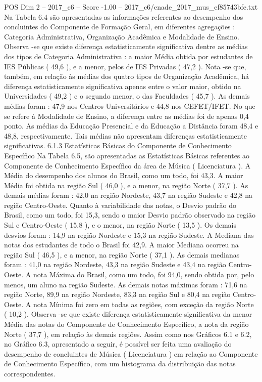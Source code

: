 \begin{textsample}{POS Dim 2 – 2017\_c6 – Score -1.00 – 2017\_c6/enade\_2017\_mus\_ef85743bfe.txt}
Na Tabela 6.4 são apresentadas as informações referentes ao desempenho dos concluintes do Componente de Formação Geral, em diferentes agregações : Categoria Administrativa, Organização Acadêmica e Modalidade de Ensino.
Observa -se que existe diferença estatisticamente significativa dentre as médias dos tipos de Categoria Administrativa : a maior Média obtida por estudantes de IES Públicas ( 49,6 ), e a menor, pelos de IES Privadas ( 47,2 ).
Nota -se que, também, em relação às médias dos quatro tipos de Organização Acadêmica, há diferença estatisticamente significativa apenas entre o valor maior, obtido na Universidades ( 49,2 ) e o segundo menor, o das Faculdades ( 45,7 ).
As demais médias foram : 47,9 nos Centros Universitários e 44,8 nos CEFET/IFET.
No que se refere à Modalidade de Ensino, a diferença entre as médias foi de apenas 0,4 ponto.
As médias da Educação Presencial e da Educação a Distância foram 48,4 e 48,8, respectivamente.
Tais médias não apresentam diferenças estatisticamente significativas. 6.1.3 Estatísticas Básicas do Componente de Conhecimento Específico Na Tabela 6.5, são apresentadas as Estatísticas Básicas referentes ao Componente de Conhecimento Específico da área de Música ( Licenciatura ).
A Média do desempenho dos alunos do Brasil, como um todo, foi 43,3.
A maior Média foi obtida na região Sul ( 46,0 ), e a menor, na região Norte ( 37,7 ).
As demais médias foram : 42,0 na região Nordeste, 43,7 na região Sudeste e 42,8 na região Centro-Oeste.
Quanto à variabilidade das notas, o Desvio padrão do Brasil, como um todo, foi 15,3, sendo o maior Desvio padrão observado na região Sul e Centro-Oeste ( 15,8 ), e o menor, na região Norte ( 13,5 ).
Os demais desvios foram : 14,9 na região Nordeste e 15,3 na região Sudeste.
A Mediana das notas dos estudantes de todo o Brasil foi 42,9.
A maior Mediana ocorreu na região Sul ( 46,5 ), e a menor, na região Norte ( 37,1 ).
As demais medianas foram : 41,0 na região Nordeste, 43,3 na região Sudeste e 43,4 na região Centro-Oeste.
A nota Máxima do Brasil, como um todo, foi 94,0, sendo obtida por, pelo menos, um aluno na região Sudeste.
As demais notas máximas foram : 71,6 na região Norte, 89,9 na região Nordeste, 83,3 na região Sul e 80,4 na região Centro-Oeste.
A nota Mínima foi zero em todas as regiões, com exceção da região Norte ( 10,2 ).
Observa -se que existe diferença estatisticamente significativa da menor Média das notas do Componente de Conhecimento Específico, a nota da região Norte ( 37,7 ), em relação às demais regiões.
Assim como nos Gráficos 6.1 e 6.2, no Gráfico 6.3, apresentado a seguir, é possível ser feita uma avaliação do desempenho de concluintes de Música ( Licenciatura ) em relação ao Componente de Conhecimento Específico, com um histograma da distribuição das notas correspondentes.

\end{textsample}
